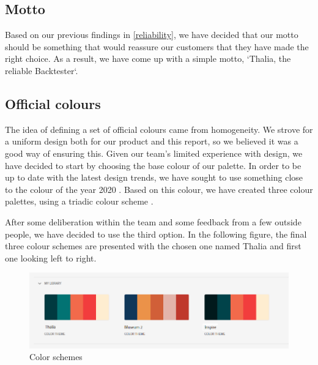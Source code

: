 \documentclass[main.tex]{subfiles}
\begin{document}
\subsection{Motto}

Based on our previous findings in \ref{reliability}, we have decided that our motto should be something that would reassure our customers that they have made the right choice. As a result, we have come up with a simple motto, `Thalia, the reliable Backtester`.


\subsection{Official colours} 

The idea of defining a set of official colours came from homogeneity. We strove for a uniform design both for our product and this report, so we believed it was a good way of ensuring this. Given our team's limited experience with design, we have decided to start by choosing the base colour of our palette. In order to be up to date with the latest design trends, we have sought to use something close to the colour of the year 2020 \cite{pantone}. Based on this colour, we have created three colour palettes, using a triadic colour scheme \cite{triadic}.

After some deliberation within the team and some feedback from a few outside people, we have decided to use the third option. In the following figure, the final three colour schemes are presented with the chosen one named Thalia and first one looking left to right.

\begin{figure}[H]
    \includegraphics[width=\textwidth]{00Branding/00Pictures/color_schemes.png}
    \caption{Color schemes}
\end{figure}
\end{document}
